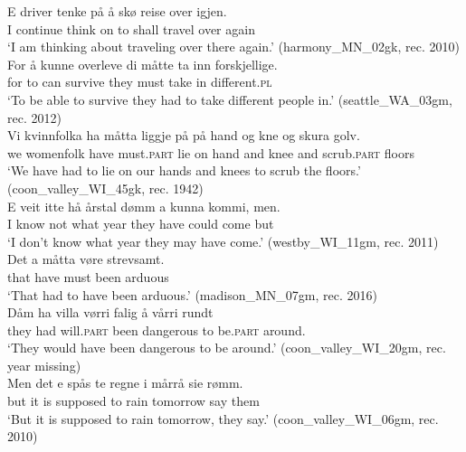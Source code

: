 \documentclass[output=paper]{langscibook}
\begin{document}
\ea%
    \label{ex:eide:13}
    \ea \label{ex:eide:13a}  
    \gll      E driver tenke på å skø reise over igjen.       \\
              I continue think on to shall travel over again       \\
    \glt     ‘I am thinking about traveling over there again.’ (harmony\_MN\_02gk, rec. 2010)\\
    \ex \label{ex:eide:13b} 
    \gll     For å kunne overleve di måtte ta inn forskjellige.    \\
             for to can survive they must take in different.\textsc{pl}    \\
    \glt     ‘To be able to survive they had to take different people in.’ (seattle\_WA\_03gm, rec. 2012)\\
    \ex \label{ex:eide:13c} 
    \gll     Vi kvinnfolka ha måtta liggje på på hand og kne      og skura golv.           \\
             we womenfolk have must.\textsc{part} lie on {} hand and knee   and scrub.\textsc{part} floors  \\
    \glt 	‘We have had to lie on our hands and knees to scrub the floors.’ (coon\_valley\_WI\_45gk, rec. 1942)\\
    \ex \label{ex:eide:13d} 
    \gll     E veit itte hå årstal dømm a kunna kommi, men.      \\
             I know not what year they have could come but      \\
    \glt     ‘I don’t know what year they may have come.’ (westby\_WI\_11gm, rec. 2011)\\
    \ex \label{ex:eide:13e} 
    \gll     Det a måtta vøre strevsamt.          \\
             that have must been arduous          \\
    \glt     ‘That had to have been arduous.’ (madison\_MN\_07gm, rec. 2016)\\
    \ex \label{ex:eide:13f} 
    \gll     Dåm ha villa vørri falig å vårri rundt                                 \\
         	they had will.\textsc{part} been dangerous to be.\textsc{part} around.       \\
    \glt 	‘They would have been dangerous to be around.’ ({{coon\_valley\_WI\_20gm}}, rec. year missing)\\
    \ex \label{ex:eide:13g} 
    \gll Men det e spås te regne {i mårrå} sie rømm.          \\
         but it is supposed to rain tomorrow say them       \\
    \glt ‘But it is supposed to rain tomorrow, they say.’ (coon\_valley\_WI\_06gm, rec. 2010)\\
    \z %
\z
\end{document}
